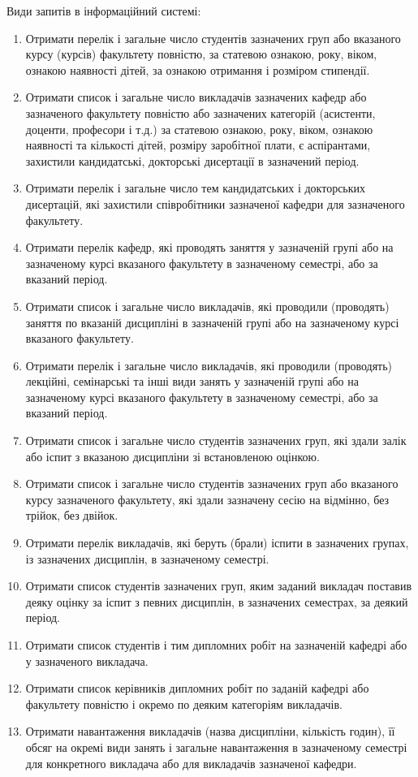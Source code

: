 Види запитів в інформаційний системі:
\begin{enumerate}
    \item Отримати перелік і загальне число студентів зазначених груп 
    або вказаного курсу (курсів) факультету повністю, 
    за статевою ознакою, року, віком, ознакою наявності дітей, 
    за ознакою отримання і розміром стипендії. 
    \item Отримати список і загальне число викладачів зазначених кафедр 
    або зазначеного факультету повністю або зазначених категорій 
    (асистенти, доценти, професори і т.д.) за статевою ознакою, 
    року, віком, ознакою наявності та кількості дітей, розміру 
    заробітної плати, є аспірантами, захистили кандидатські, 
    докторські дисертації в зазначений період.
    \item Отримати перелік і загальне число тем кандидатських 
    і докторських дисертацій, які захистили співробітники 
    зазначеної кафедри для зазначеного факультету.
    \item Отримати перелік кафедр, які проводять заняття 
    у зазначеній групі або на зазначеному курсі 
    вказаного факультету в зазначеному семестрі, 
    або за вказаний період.
    \item Отримати список і загальне число викладачів, 
    які проводили (проводять) заняття по вказаній 
    дисципліні в зазначеній групі або на зазначеному 
    курсі вказаного факультету.
    \item Отримати перелік і загальне число викладачів, 
    які проводили (проводять) лекційні, семінарські 
    та інші види занять у зазначеній групі або на 
    зазначеному курсі вказаного факультету в зазначеному 
    семестрі, або за вказаний період.
    \item Отримати список і загальне число студентів 
    зазначених груп, які здали залік або іспит
    з вказаною дисципліни зі встановленою оцінкою.
    \item Отримати список і загальне число студентів 
    зазначених груп або вказаного курсу зазначеного 
    факультету, які здали зазначену сесію на відмінно, 
    без трійок, без двійок.
    \item Отримати перелік викладачів, які беруть (брали) 
    іспити в зазначених групах, із зазначених дисциплін, 
    в зазначеному семестрі.
    \item Отримати список студентів зазначених груп, 
    яким заданий викладач поставив деяку оцінку 
    за іспит з певних дисциплін, в зазначених семестрах, 
    за деякий період.
    \item Отримати список студентів і тим дипломних робіт 
    на зазначеній кафедрі або у зазначеного викладача.
    \item Отримати список керівників дипломних робіт 
    по заданій кафедрі або факультету повністю 
    і окремо по деяким категоріям викладачів.
    \item Отримати навантаження викладачів (назва дисципліни, кількість годин), 
    її обсяг на окремі види занять і загальне навантаження в зазначеному 
    семестрі для конкретного викладача або для викладачів зазначеної кафедри.
\end{enumerate}